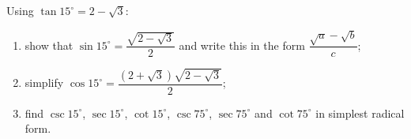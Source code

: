 Using $\tan15^\circ=2-\sqrt3$:
\begin{enumerate}
\item[(a)] show that $\sin15^\circ=\dfrac{\sqrt{2-\sqrt3}}{2}$ and write this in the form $\dfrac{\sqrt a-\sqrt b}{c}$;
\item[(b)] simplify $\cos15^\circ=\dfrac{\left(2+\sqrt3\right)\sqrt{2-\sqrt3}}{2}$;
\item[(c)] find $\csc15^\circ$, $\sec15^\circ$, $\cot15^\circ$, $\csc75^\circ$, $\sec75^\circ$ and $\cot75^\circ$ in simplest radical form.
\end{enumerate}
